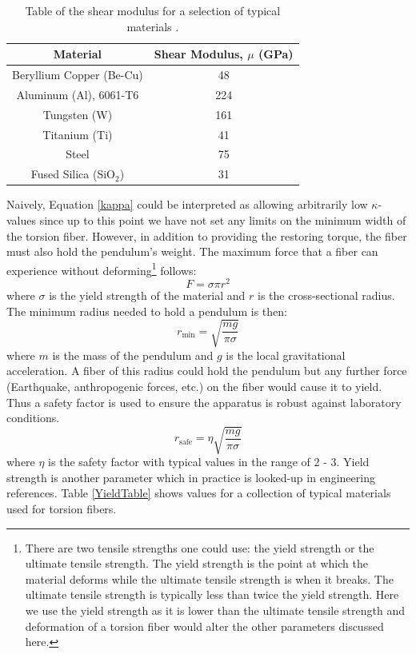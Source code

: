 \documentclass{book}
\begin{document}
\begin{center}		
	\begingroup
	\setlength{\tabcolsep}{10pt} %
	\renewcommand{\arraystretch}{1.5} %
	\begin{table}[ht!]
		\begin{center}
			\begin{tabular}{ |c|c| }
				\hline
				Material & Shear Modulus, $\mu$ (GPa) \\
				\hline
				Beryllium Copper (Be-Cu) & 48\\
				Aluminum (Al), 6061-T6 & 224\\
				Tungsten (W) & 161 \\ 
				Titanium (Ti) & 41\\
				Steel & 75\\
				Fused Silica (SiO$_2$) & 31 \\
				\hline
				
			\end{tabular}
			\caption{Table of the shear modulus for a selection of typical materials \cite{shear, quartz}.}\label{ShearTable}
		\end{center}
	\end{table}
	\endgroup
\end{center}

Naively, Equation \ref{kappa} could be interpreted as allowing arbitrarily low $\kappa$-values since up to this point we have not set any limits on the minimum width of the torsion fiber. However, in addition to providing the restoring torque, the fiber must also hold the pendulum's weight. The maximum force that a fiber can experience without deforming\footnote{There are two tensile strengths one could use: the yield strength or the ultimate tensile strength. The yield strength is the point at which the material deforms while the ultimate tensile strength is when it breaks. The ultimate tensile strength is typically less than twice the yield strength. Here we use the yield strength as it is lower than the ultimate tensile strength and deformation of a torsion fiber would alter the other parameters discussed here.} follows:
\begin{equation}
F=\sigma \pi r^2
\end{equation}
where $\sigma$ is the yield strength of the material and $r$ is the cross-sectional radius. The minimum radius needed to hold a pendulum is then:
\begin{equation}
r_{\text{min}}=\sqrt{\frac{m g}{\pi \sigma}}
\end{equation}
where $m$ is the mass of the pendulum and $g$ is the local gravitational acceleration. A fiber of this radius could hold the pendulum but any further force (Earthquake, anthropogenic forces, etc.) on the fiber would cause it to yield. Thus a safety factor is used to ensure the apparatus is robust against laboratory conditions.
\begin{equation}
r_{\text{safe}}=\eta \sqrt{\frac{m g}{\pi \sigma}}
\end{equation}
where $\eta$ is the safety factor with typical values in the range of 2 - 3. Yield strength is another parameter which in practice is looked-up in engineering references. Table \ref{YieldTable} shows values for a collection of typical materials used for torsion fibers.
\end{document}
